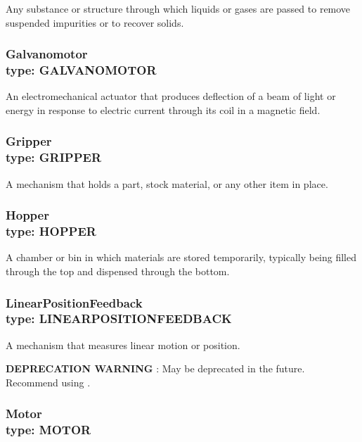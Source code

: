 Any substance or structure through which liquids or gases are passed to remove suspended impurities or to recover solids.


\subsubsection[Galvanomotor]{Galvanomotor \\ {\small type: GALVANOMOTOR}}
\label{sec:Galvanomotor}



An electromechanical actuator that produces deflection of a beam of light or energy in response to electric current through its coil in a magnetic field.


\subsubsection[Gripper]{Gripper \\ {\small type: GRIPPER}}
\label{sec:Gripper}



A mechanism that holds a part, stock material, or any other item in place.


\subsubsection[Hopper]{Hopper \\ {\small type: HOPPER}}
\label{sec:Hopper}



A chamber or bin in which materials are stored temporarily, typically being filled through the top and dispensed through the bottom.


\subsubsection[LinearPositionFeedback]{LinearPositionFeedback \\ {\small type: LINEAR\textunderscore POSITION\textunderscore FEEDBACK}}
\label{sec:LinearPositionFeedback}



A mechanism that measures linear motion or position.

\textbf{DEPRECATION WARNING} : May be deprecated in the future. Recommend using .


\subsubsection[Motor]{Motor \\ {\small type: MOTOR}}
\label{sec:Motor}



